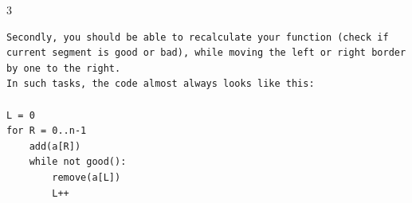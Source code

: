 \documentclass[9pt, a4paper, notitlepage]{extreport}
\begin{document}
\begin{multicols}{3}
\begin{verbatim}
Secondly, you should be able to recalculate your function (check if current segment is good or bad), while moving the left or right border by one to the right.
In such tasks, the code almost always looks like this:

L = 0
for R = 0..n-1
    add(a[R])
    while not good():
        remove(a[L])
        L++
\end{verbatim}




















% 

\end{multicols}
\end{document}
